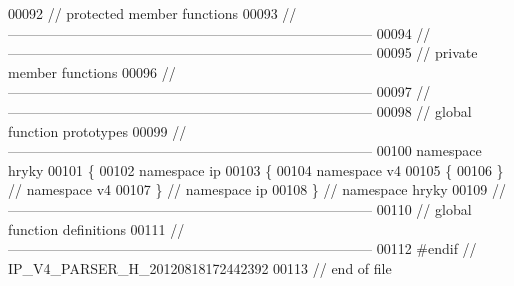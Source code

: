 \begin{DoxyCode}
00092 \textcolor{comment}{// protected member functions}
00093 \textcolor{comment}{//
      ------------------------------------------------------------------------------}
00094 \textcolor{comment}{//
      ------------------------------------------------------------------------------}
00095 \textcolor{comment}{// private member functions}
00096 \textcolor{comment}{//
      ------------------------------------------------------------------------------}
00097 \textcolor{comment}{//
      ------------------------------------------------------------------------------}
00098 \textcolor{comment}{// global function prototypes}
00099 \textcolor{comment}{//
      ------------------------------------------------------------------------------}
00100 \textcolor{keyword}{namespace }hryky
00101 \{
00102 \textcolor{keyword}{namespace }ip
00103 \{
00104 \textcolor{keyword}{namespace }v4
00105 \{
00106 \} \textcolor{comment}{// namespace v4}
00107 \} \textcolor{comment}{// namespace ip}
00108 \} \textcolor{comment}{// namespace hryky}
00109 \textcolor{comment}{//
      ------------------------------------------------------------------------------}
00110 \textcolor{comment}{// global function definitions}
00111 \textcolor{comment}{//
      ------------------------------------------------------------------------------}
00112 \textcolor{preprocessor}{#endif // IP\_V4\_PARSER\_H\_20120818172442392}
00113 \textcolor{preprocessor}{}\textcolor{comment}{// end of file}
\end{DoxyCode}
